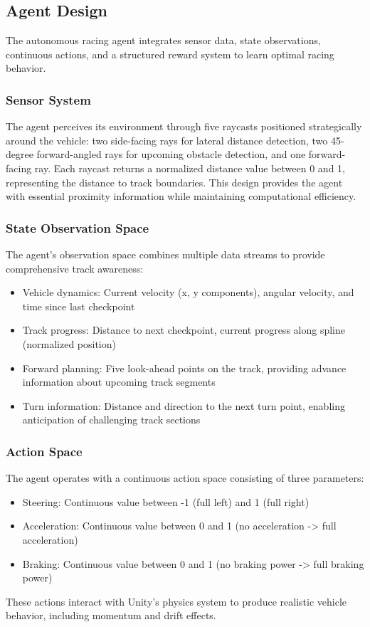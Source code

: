 \documentclass[10pt,twocolumn]{article}
\begin{document}
\subsection{Agent Design}
The autonomous racing agent integrates sensor data, state observations, continuous actions, and a structured reward system to learn optimal racing behavior.

\subsubsection{Sensor System}
The agent perceives its environment through five raycasts positioned strategically around the vehicle: two side-facing rays for lateral distance detection, two 45-degree forward-angled rays for upcoming obstacle detection, and one forward-facing ray. Each raycast returns a normalized distance value between 0 and 1, representing the distance to track boundaries. This design provides the agent with essential proximity information while maintaining computational efficiency.

\subsubsection{State Observation Space}
The agent's observation space combines multiple data streams to provide comprehensive track awareness:
\begin{itemize}
    \item Vehicle dynamics: Current velocity (x, y components), angular velocity, and time since last checkpoint
    \item Track progress: Distance to next checkpoint, current progress along spline (normalized position)
    \item Forward planning: Five look-ahead points on the track, providing advance information about upcoming track segments
    \item Turn information: Distance and direction to the next turn point, enabling anticipation of challenging track sections
\end{itemize}

\subsubsection{Action Space}
The agent operates with a continuous action space consisting of three parameters:
\begin{itemize}
    \item Steering: Continuous value between -1 (full left) and 1 (full right)
    \item Acceleration: Continuous value between 0 and 1 (no acceleration -> full acceleration)
    \item Braking: Continuous value between 0 and 1 (no braking power -> full braking power)
\end{itemize}
These actions interact with Unity's physics system to produce realistic vehicle behavior, including momentum and drift effects.
\end{document}
